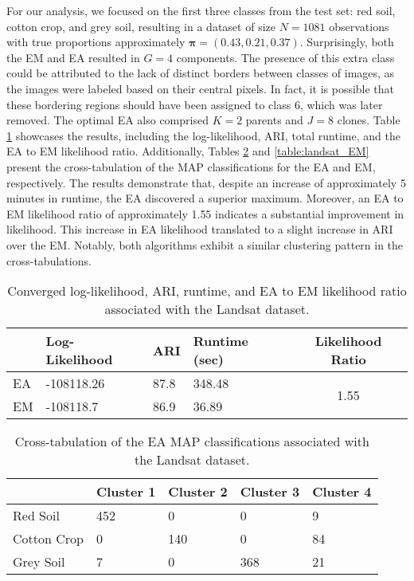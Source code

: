 \documentclass[12pt, centerh1]{article}
\begin{document}
For our analysis, we focused on the first three classes from the test set: red soil, cotton crop, and grey soil, resulting in a dataset of size $N = 1081$ observations with true proportions approximately $\bm{\pi} = (0.43, 0.21, 0.37)$. Surprisingly, both the EM and EA resulted in $G=4$ components. The presence of this extra class could be attributed to the lack of distinct borders between classes of images, as the images were labeled based on their central pixels. In fact, it is possible that these bordering regions should have been assigned to class 6, which was later removed. The optimal EA also comprised $K=2$ parents and $J=8$ clones. Table \ref{table:landsat_results} showcases the results, including the log-likelihood, ARI, total runtime, and the EA to EM likelihood ratio. Additionally, Tables \ref{table:landsat_EA} and \ref{table:landsat_EM} present the cross-tabulation of the MAP classifications for the EA and EM, respectively. The results demonstrate that, despite an increase of approximately 5 minutes in runtime, the EA discovered a superior maximum. Moreover, an EA to EM likelihood ratio of approximately 1.55 indicates a substantial improvement in likelihood. This increase in EA likelihood translated to a slight increase in ARI over the EM. Notably, both algorithms exhibit a similar clustering pattern in the cross-tabulations.


\begin{table}[!htbp]
  \caption{Converged log-likelihood, ARI, runtime, and EA to EM likelihood ratio associated with the Landsat dataset.}
      \label{table:landsat_results}
  \begin{tabularx}{\textwidth}{l *{3}{X}c}
  \toprule
    &\textbf{Log-Likelihood}& \textbf{ARI} & \textbf{Runtime (sec)} & \textbf{Likelihood Ratio} \\
  \midrule
   EA & -108118.26     & 87.8 &  348.48 & \multirow{2}{*}{1.55}\\
  EM & -108118.7          & 86.9 & 36.89    \\
  \bottomrule
  \end{tabularx}
\end{table}

\begin{table}[!htbp]
  \caption{Cross-tabulation of the EA MAP classifications associated with the Landsat dataset.}
      \label{table:landsat_EA}
  \begin{tabularx}{\textwidth}{l *{4}{X}}
  \toprule
   &\textbf{Cluster 1}  & \textbf{Cluster 2}  & \textbf{Cluster 3}  & \textbf{Cluster 4}   \\
  \midrule
  Red Soil & 	452 & 0 & 0 & 9\\
  Cotton Crop &0 & 140 &  0 & 84 \\
   Grey Soil &   7 & 0 &  368  & 21\\
  \bottomrule
  \end{tabularx}
\end{table}
\end{document}
